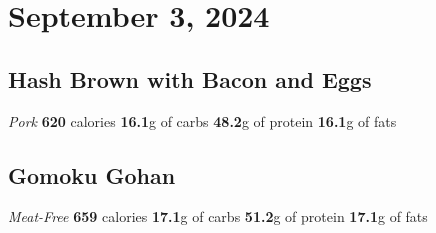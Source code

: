 \documentclass{article}%
\begin{document}
%
\section*{September 3, 2024}%
\label{sec:September3,2024}%
\begin{paracol}[2]{2}%
\sloppy%
\subsection*{Hash Brown with Bacon and Eggs}%
\label{subsec:HashBrownwithBaconandEggs}%
\textit{Pork}%
\newline%
\newline%
\textbf{620} calories%
\newline%
\textbf{16.1}g of carbs%
\newline%
\textbf{48.2}g of protein%
\newline%
\textbf{16.1}g of fats%
\newline%
\switchcolumn

%
\subsection*{Gomoku Gohan}%
\label{subsec:GomokuGohan}%
\textit{Meat{-}Free}%
\newline%
\newline%
\textbf{659} calories%
\newline%
\textbf{17.1}g of carbs%
\newline%
\textbf{51.2}g of protein%
\newline%
\textbf{17.1}g of fats%
\newline%
\switchcolumn

%
\end{paracol}

%
\end{document}

